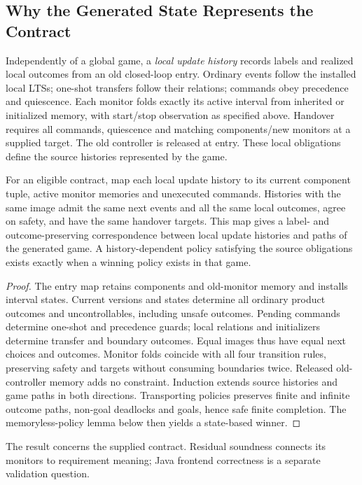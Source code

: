 \subsection{Why the Generated State Represents the Contract}
\label{sec:contract-adequacy}
Independently of a global game, a \emph{local update history} records labels and realized local outcomes from an old closed-loop entry. Ordinary events follow the installed local LTSs; one-shot transfers follow their relations; commands obey precedence and quiescence. Each monitor folds exactly its active interval from inherited or initialized memory, with start/stop observation as specified above. Handover requires all commands, quiescence and matching components/new monitors at a supplied target. The old controller is released at entry. These local obligations define the source histories represented by the game.

\begin{proposition}
\label{prop:contract-adequacy}
For an eligible contract, map each local update history to its current component tuple, active monitor memories and unexecuted commands. Histories with the same image admit the same next events and all the same local outcomes, agree on safety, and have the same handover targets. This map gives a label- and outcome-preserving correspondence between local update histories and paths of the generated game. A history-dependent policy satisfying the source obligations exists exactly when a winning policy exists in that game.
\end{proposition}
\begin{proof}
The entry map retains components and old-monitor memory and installs interval states. Current versions and states determine all ordinary product outcomes and uncontrollables, including unsafe outcomes. Pending commands determine one-shot and precedence guards; local relations and initializers determine transfer and boundary outcomes. Equal images thus have equal next choices and outcomes. Monitor folds coincide with all four transition rules, preserving safety and targets without consuming boundaries twice. Released old-controller memory adds no constraint. Induction extends source histories and game paths in both directions. Transporting policies preserves finite and infinite outcome paths, non-goal deadlocks and goals, hence safe finite completion. The memoryless-policy lemma below then yields a state-based winner.
\end{proof}
The result concerns the supplied contract. Residual soundness connects its monitors to requirement meaning; Java frontend correctness is a separate validation question.
